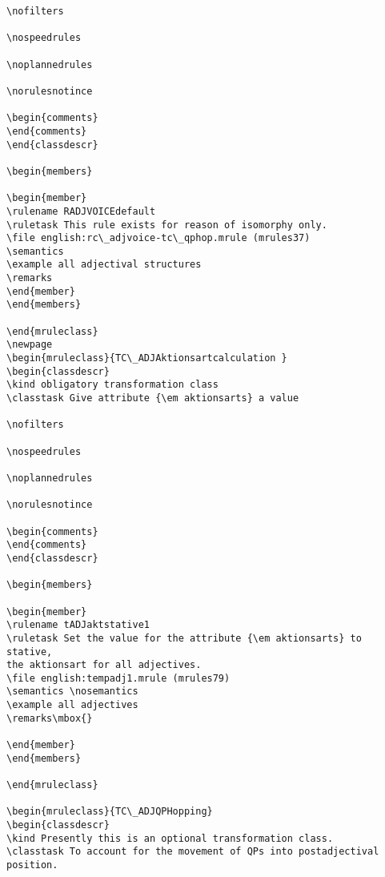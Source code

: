 \begin{verbatim}
\nofilters

\nospeedrules

\noplannedrules

\norulesnotince

\begin{comments}
\end{comments}
\end{classdescr}

\begin{members}

\begin{member}
\rulename RADJVOICEdefault
\ruletask This rule exists for reason of isomorphy only.
\file english:rc\_adjvoice-tc\_qphop.mrule (mrules37)
\semantics 
\example all adjectival structures
\remarks
\end{member}
\end{members}

\end{mruleclass}
\newpage
\begin{mruleclass}{TC\_ADJAktionsartcalculation }
\begin{classdescr}
\kind obligatory transformation class
\classtask Give attribute {\em aktionsarts} a value

\nofilters

\nospeedrules

\noplannedrules

\norulesnotince

\begin{comments}
\end{comments}
\end{classdescr}

\begin{members}

\begin{member}
\rulename tADJaktstative1
\ruletask Set the value for the attribute {\em aktionsarts} to stative, 
the aktionsart for all adjectives.
\file english:tempadj1.mrule (mrules79)
\semantics \nosemantics
\example all adjectives
\remarks\mbox{}

\end{member}
\end{members}

\end{mruleclass}

\begin{mruleclass}{TC\_ADJQPHopping}
\begin{classdescr}
\kind Presently this is an optional transformation class.
\classtask To account for the movement of QPs into postadjectival position.


\end{verbatim}
